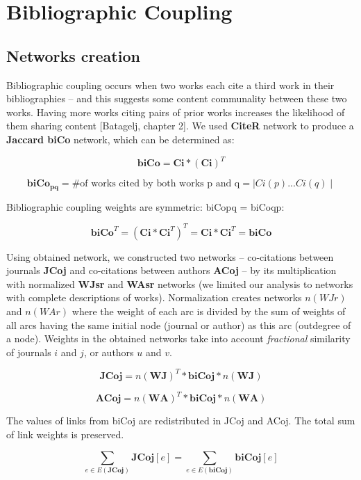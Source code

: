 \documentclass[11pt]{article} %
\begin{document}
\section{Bibliographic Coupling}

\subsection{Networks creation} 

Bibliographic coupling occurs when two works each cite a third work in their bibliographies -- and this suggests some content communality between these two works. Having more works citing pairs of prior works increases the likelihood of them sharing content [Batagelj, chapter 2]. We used \textbf{CiteR} network to produce a \textbf{Jaccard biCo} network, which can be determined as: 

\[ \mathbf{biCo} = \mathbf{Ci} * (\mathbf{Ci}) ^ T \]  

\[ \mathbf{biCo_{pq}} = \textrm{\# of works cited by both works p and q} = \mid Ci(p) ...  Ci(q) \mid \]  

Bibliographic coupling weights are symmetric: biCopq = biCoqp:

\[ \mathbf{biCo}^T = (\mathbf{Ci} * \mathbf{Ci} ^ T ) ^ T = \mathbf{Ci} * \mathbf{Ci}^T = \mathbf{biCo} \] 

Using obtained network, we constructed two networks -- co-citations between journals \textbf{JCoj} and co-citations between authors \textbf{ACoj} -- by its multiplication with normalized \textbf{WJsr} and \textbf{WAsr} networks (we limited our analysis to networks with complete descriptions of works).  Normalization creates networks $n(WJr)$ and $n(WAr)$ where the weight of each arc is divided by the sum of weights of all arcs having the same initial node (journal or author) as this arc (outdegree of a node). Weights in the obtained networks take into account \textit{fractional} similarity of journals $i$ and $j$, or authors $u$ and $v$.  \medskip

\[ \mathbf{JCoj} = n(\mathbf{WJ}) ^ T * \mathbf{biCoj} * n(\mathbf{WJ}) \]  

\[ \mathbf{ACoj} = n(\mathbf{WA}) ^ T * \mathbf{biCoj} * n(\mathbf{WA}) \]  

The values of links from biCoj are redistributed in JCoj and ACoj. The total sum of link weights is preserved.

	\[ \sum_{e \in E(\mathbf{JCoj})} \mathbf{JCoj}[e] = \sum_{e \in E(\mathbf{biCoj})} \mathbf{biCoj}[e] \] 
\end{document}
